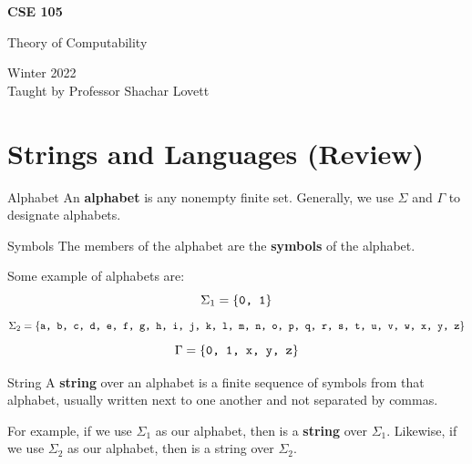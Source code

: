 \documentclass[letterpaper]{article}
\begin{document}
\begin{titlepage}
    \begin{center}
        \vspace*{1cm}
            
        \Huge
        \textbf{CSE 105}
            
        \vspace{0.5cm}
        \LARGE
        Theory of Computability
            
        \vspace{1.5cm}
            
        \vfill
            
        Winter 2022 \\
        Taught by Professor Shachar Lovett
    \end{center}
\end{titlepage}


\newpage 

\begingroup
    \renewcommand\contentsname{Table of Contents}
    \tableofcontents
\endgroup

\newpage
{}

\section{Strings and Languages (Review)}
\begin{definition}{Alphabet}{}
    An \textbf{alphabet} is any nonempty finite set. Generally, we use $\Sigma$ and $\Gamma$ to designate alphabets.
\end{definition}

\begin{definition}{Symbols}{}
    The members of the alphabet are the \textbf{symbols} of the alphabet.
\end{definition}

Some example of alphabets are: 
\[\Sigma_1 = \{\texttt{0, 1}\}\]
\[\Sigma_2 = \{\texttt{a, b, c, d, e, f, g, h, i, j, k, l, m, n, o, p, q, r, s, t, u, v, w, x, y, z}\}\]
\[\Gamma = \{\texttt{0, 1, x, y, z}\}\]

\begin{definition}{String}{}
    A \textbf{string} over an alphabet is a finite sequence of symbols from that alphabet, usually written next to one another and not separated by commas. 
\end{definition}
For example, if we use $\Sigma_1$ as our alphabet, then  is a \textbf{string} over $\Sigma_1$. Likewise, if we use $\Sigma_2$ as our alphabet, then  is a string over $\Sigma_2$. 
\end{document}
